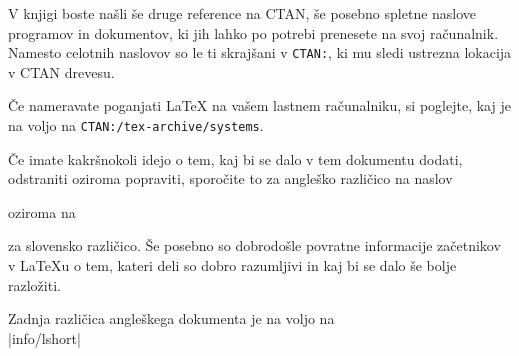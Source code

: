 V knjigi boste našli še druge reference na CTAN, še posebno spletne naslove 
programov in dokumentov, ki jih lahko po potrebi prenesete na svoj računalnik. Namesto
celotnih naslovov so le ti skrajšani v \texttt{CTAN:}, ki mu sledi 
ustrezna lokacija v CTAN drevesu.

Če nameravate poganjati \LaTeX{} na vašem lastnem računalniku, si poglejte, kaj je na voljo 
na \texttt{CTAN:/tex-archive/systems}.

\noindent Če imate kakršnokoli idejo o tem, kaj bi se dalo v tem dokumentu dodati, odstraniti oziroma
popraviti, sporočite to za angleško različico na naslov 
\begin{verse}
%
\end{verse}
oziroma na 
\begin{verse}
%
\end{verse}
za slovensko različico. Še posebno so dobrodošle povratne informacije
začetnikov v \LaTeX{}u o tem, kateri deli so dobro razumljivi in kaj bi se
dalo še bolje razložiti.

\vspace{3ex}
\noindent Zadnja različica angleškega dokumenta je na voljo na\\
\CTAN|info/lshort|


\endinput



%

